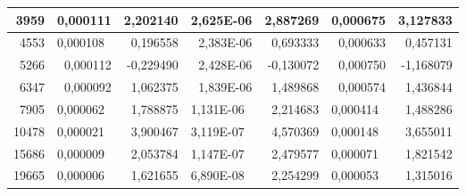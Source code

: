 \documentclass[14pt]{article}
\begin{document}
\begin{table}[H]
\begin{tabular}{|r|r|r|r|r|r|r|}
3959                        & 0,000111                      & 2,202140                  & 2,625E-06                      & 2,887269                  & 0,000675                      & 3,127833                    \\ \hline
4553                        & \multicolumn{1}{l|}{0,000108} & 0,196558                  & 2,383E-06                      & 0,693333                  & 0,000633                      & 0,457131                    \\ \hline
5266                        & 0,000112                      & -0,229490                 & 2,428E-06                      & -0,130072                 & 0,000750                      & -1,168079                   \\ \hline
6347                        & 0,000092                      & 1,062375                  & 1,839E-06                      & 1,489868                  & 0,000574                      & 1,436844                    \\ \hline
7905  & \multicolumn{1}{l|}{0,000062} & 1,788875                  & \multicolumn{1}{l|}{1,131E-06} & 2,214683                  & \multicolumn{1}{l|}{0,000414} & 1,488286                    \\ \hline
\multicolumn{1}{|l|}{10478} & \multicolumn{1}{l|}{0,000021} & 3,900467                  & \multicolumn{1}{l|}{3,119E-07} & 4,570369                  & \multicolumn{1}{l|}{0,000148} & 3,655011                    \\ \hline
\multicolumn{1}{|l|}{15686} & \multicolumn{1}{l|}{0,000009} & 2,053784                  & \multicolumn{1}{l|}{1,147E-07} & 2,479577                  & \multicolumn{1}{l|}{0,000071} & 1,821542                    \\ \hline
\multicolumn{1}{|l|}{19665} & \multicolumn{1}{l|}{0,000006} & 1,621655                  & \multicolumn{1}{l|}{6,890E-08} & 2,254299                  & \multicolumn{1}{l|}{0,000053} & 1,315016                    \\ \hline
\end{tabular}

\end{table}
\newpage
\end{document}
